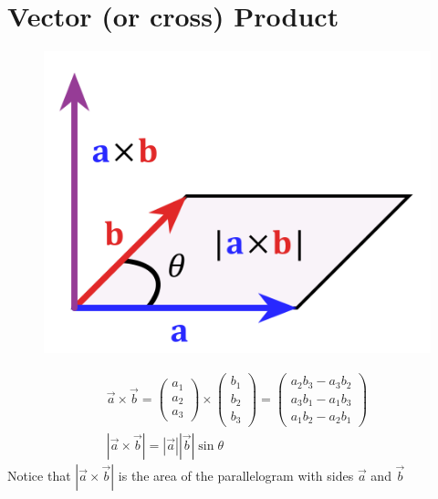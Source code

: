 \documentclass[a4paper, 11pt, normalem]{report}
\begin{document}
\section{Vector (or cross) Product}
\begin{figure}
    \begin{center}
        \includegraphics[scale=0.3]{Cross.png}
    \end{center}
    \vspace{-200pt}
\end{figure}
\begin{gather*}
    \vec{a} \times \vec{b} =
    \begin{pmatrix}
        a_1 \\
        a_2 \\
        a_3
    \end{pmatrix}
    \times
    \begin{pmatrix}
        b_1 \\
        b_2 \\
        b_3
    \end{pmatrix}
    =
    \begin{pmatrix}
        a_{2}b_{3} - a_{3}b_{2} \\
        a_{3}b_{1} - a_{1}b_{3} \\
        a_{1}b_{2} - a_{2}b_{1}
    \end{pmatrix} \\
    |\vec{a} \times \vec{b}| = |\vec{a}||\vec{b}|\sin\theta
\end{gather*}
Notice that $|\vec{a} \times \vec{b}|$ is the area of the parallelogram with sides $\vec{a}$ and $\vec{b}$
\end{document}
